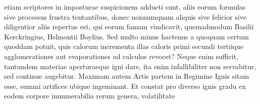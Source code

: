 etiam scriptores in imposturae suspicionem adducti sunt, aliis eorum formulas sive processus frustra tentantibus,
donec nonnumquam aliquis sive felicior sive diligentior aliis repertus est, qui eorum famam vindicavit,
quemadmodum Basilii\protect{}
Kerckringius,\protect{}
Helmontii\protect{}
Boylius.\protect{}
\pend%
\pstart%
Sed multo minus  hactenus a quoquam certum quoddam  potuit, quis
calorum\protect{} incrementa
illas caloris\protect{} primi secundi tertiique agglomerationes aut evaporationes ad calculos revocet?
Neque enim
sufficit, tantundem materiae aperturaeque igni dare, ita enim infallibiliter non
servabitur, sed continue
augebitur.%
%
\pend%
\pstart%
Maximam
autem Artis partem in Regimine Ignis sitam esse, summi artifices ubique ingeminant.
Et constat pro diverso ignis gradu ex eodem corpore innumerabilia rerum genera, volatilitate%
